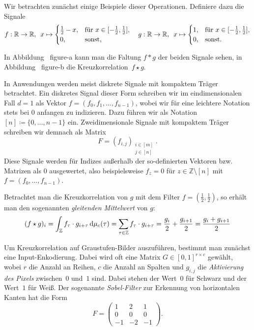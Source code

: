 \documentclass[paper=a4, 	%
		fontsize=11pt,
		abstract=true, 	%
		headsepline, 	%
		notitlepage	%
		]{scrartcl}
\theoremstyle{definition}
\newcommand{\R}{\mathbb{R}}
\newcommand{\Z}{\mathbb{Z}}
\newcommand{\diff}{\,\textrm{d}}
\newcommand{\todo}[1]{{\color{red} #1}}
\newcommand{\fNat}[1]{[ #1 ]}
\begin{document}
Wir betrachten zunächst einige Beispiele dieser Operationen.
Definiere dazu die Signale
\begin{align*}
    f: \R \rightarrow \R, \hspace{0.5em} x \mapsto \begin{cases}
        \frac{1}{2} - x, & \text{für $x\in[-\frac{1}{2},\frac{1}{2}]$,}\\
        0, & \text{sonst,}
    \end{cases} \quad
    g: \R \rightarrow \R,\hspace{0.5em} x \mapsto \begin{cases}
        1,& \text{für $x \in [-\frac{1}{2},\frac{1}{2}]$,}\\
        0, & \text{sonst.}
    \end{cases}
\end{align*}

In Abbildung~\todo{figure-a} kann man die Faltung $f * g$ der beiden Signale sehen, in Abbildung~\todo{figure-b} die Kreuzkorrelation~$f\star g$.


In Anwendungen werden meist diskrete Signale mit kompaktem Träger betrachtet.
Ein diskretes Signal dieser Form schreiben wir im eindimensionalen Fall $d=1$ als Vektor $f = (f_0, f_1, \dots, f_{n-1})$, wobei wir für eine leichtere Notation stets bei $0$ anfangen zu indizieren.
Dazu führen wir als Notation $\fNat{n}\coloneqq \{0, \dots, n-1\}$ ein. 
Zweidimensionale Signale mit kompaktem Träger schreiben wir demnach als Matrix $$F = (f_{i,j})_{\substack{i\in\fNat{m}\\ j\in\fNat{n}}}.$$
Diese Signale werden für Indizes außerhalb der so-definierten Vektoren bzw. Matrizen als $0$ ausgewertet, also beispielsweise $f_z = 0$ für $z\in\Z\setminus\fNat{n}$ mit $f=(f_0, \dots, f_{n-1})$.

Betrachtet man die Kreuzkorrelation von $g$ mit dem Filter $f=(\frac{1}{2}, \frac{1}{2})$, so erhält man den sogenannten \emph{gleitenden Mittelwert} von $g$:
\[  
    (f \star g)_i = \int_\Z f_\tau \cdot g_{i + \tau} \diff \cmeasure(\tau) 
    = \sum_{\tau\in\Z} f_\tau \cdot g_{i+ \tau}
    = \frac{g_i}{2} + \frac{g_{i+1}}{2} = \frac{g_i + g_{i+1}}{2}
\]

Um Kreuzkorrelation auf Graustufen-Bilder auszuführen, bestimmt man zu\-nächst eine Input-Enkodierung.
Dabei wird oft eine Matrix $G\in[0,1]^{r\times c}$ gewählt, wobei $r$ die Anzahl an Reihen, $c$ die Anzahl an Spalten und $g_{i,j}$ die \emph{Aktivierung des Pixels} zwischen~$0$ und~$1$ sind.
Dabei stehen der Wert~$0$ für Schwarz und der Wert~$1$ für Weiß.
Der sogenannte \emph{Sobel-Filter} zur Erkennung von horizontalen Kanten hat die Form
\[
    F = \begin{pmatrix}
        1 & 2 & 1 \\
        0 & 0 & 0 \\ 
        -1 & -2 & -1
    \end{pmatrix}.
\]
\end{document}
